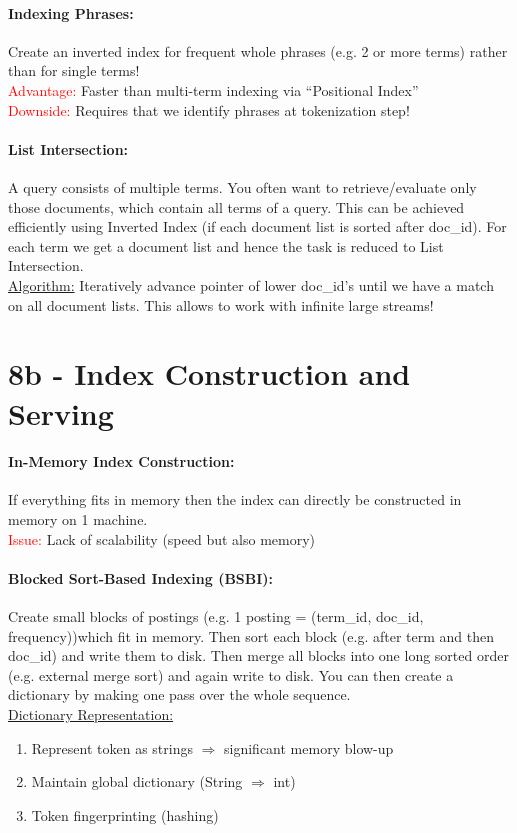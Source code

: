 \documentclass[a4paper,11pt]{article}
\newcommand{\msection}[1]{\section{#1}\vspace{-0.5mm}}
\begin{document}
\begin{multicols}{2}
\paragraph{Indexing Phrases:} Create an inverted index for frequent whole phrases (e.g. 2 or more terms) rather than for single terms! \\
\textcolor{red}{Advantage:} Faster than multi-term indexing via ``Positional Index''\\
\textcolor{red}{Downside:} Requires that we identify phrases at tokenization step!

\paragraph{List Intersection:} A query consists of multiple terms. You often want to retrieve/evaluate only those documents, which contain all terms of a query. This can be achieved efficiently using Inverted Index (if each document list is sorted after doc\_id). For each term we get a document list and hence the task is reduced to List Intersection. \\
\underline{Algorithm:} Iteratively advance pointer of lower doc\_id's until we have a match on all document lists. This allows to work with infinite large streams!

\msection{8b - Index Construction and Serving}
\paragraph{In-Memory Index Construction:} If everything fits in memory then the index can directly be constructed in memory on 1 machine.\\
\textcolor{red}{Issue:} Lack of scalability (speed but also memory)

\paragraph{Blocked Sort-Based Indexing (BSBI):} Create small blocks of postings (e.g. 1 posting = (term\_id, doc\_id, frequency))which fit in memory. Then sort each block (e.g. after term and then doc\_id) and write them to disk. Then merge all blocks into one long sorted order (e.g. external merge sort) and again write to disk. You can then create a dictionary by making one pass over the whole sequence.\\
\underline{Dictionary Representation:}
\begin{enumerate}
  \item Represent token as strings $\Rightarrow$ significant memory blow-up
  \item Maintain global dictionary (String $\Rightarrow$ int)
  \item Token fingerprinting (hashing)
\end{enumerate}


\end{multicols}
\end{document}

